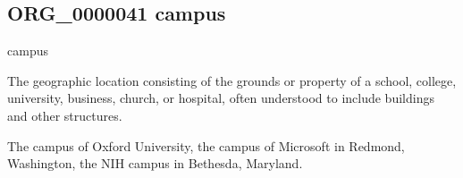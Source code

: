 \documentclass[letterpaper,10pt,english]{sphinxmanual}
\begin{document}
\begin{sphinxShadowBox}

\sphinxAtStartPar
{}
\end{sphinxShadowBox}
\begin{quote}

\ignorespaces \end{quote}


\subsection{ORG\_0000041 \sphinxhyphen{} campus}
\label{\detokenize{doc-ORG_0000041:org-0000041-campus}}\label{\detokenize{doc-ORG_0000041:index-0}}\label{\detokenize{doc-ORG_0000041::doc}}
\begin{sphinxShadowBox}

\sphinxAtStartPar
campus
\end{sphinxShadowBox}

\begin{sphinxShadowBox}

\sphinxAtStartPar
The geographic location consisting of the  grounds or property of a school, college, university, business, church, or hospital, often understood to include buildings and other structures.
\end{sphinxShadowBox}

\begin{sphinxShadowBox}

\sphinxAtStartPar
{}
\end{sphinxShadowBox}

\begin{sphinxShadowBox}

\sphinxAtStartPar
The campus of Oxford University, the campus of Microsoft in Redmond, Washington, the NIH campus in Bethesda, Maryland.
\end{sphinxShadowBox}

\begin{sphinxShadowBox}

\sphinxAtStartPar
{}
\end{sphinxShadowBox}
\end{document}
